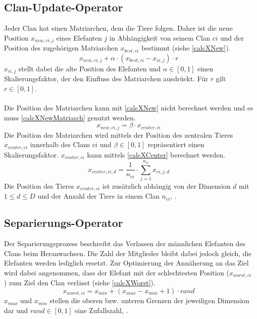 \subsection{Clan-Update-Operator} \label{eho_clanUpdate}
Jeder Clan hat einen Matriarchen, dem die Tiere folgen. Daher ist die neue Position $x_{new, ci, j}$ eines Elefanten $j$ in Abhängigkeit von seinem Clan $ci$ und der Position des zugehörigen Matriarchen $x_{best, ci}$ bestimmt (siehe \autoref{calcXNew}). 
\begin{equation}
    x_{new, ci, j} + \alpha \cdot (x_{best, ci} - x_{ci, j}) \cdot r
    \label{calcXNew}
\end{equation}
$x_{ci, j}$ stellt dabei die alte Position des Elefanten und $\alpha \in [0,1]$ einen Skalierungsfaktor, der den Einfluss des Matriarchen ausdrückt. Für $r$ gilt $r \in [0,1]$.\\
\\
Die Position des Matriarchen kann mit \autoref{calcXNew} nicht berechnet werden und es muss \autoref{calcXNewMatriarch} genutzt werden.
\begin{equation}
    x_{new, ci, j} = \beta \cdot x_{center, ci}
    \label{calcXNewMatriarch}
\end{equation}
Die Position des Matriarchen wird mittels der Position des zentralen Tieres $x_{center, ci}$ innerhalb des Clans $ci$ und $\beta \in [0,1]$ repräsentiert einen Skalierungsfaktor. $x_{center, ci}$ kann mittels \autoref{calcXCenter} berechnet werden.
\begin{equation}
    x_{center, ci, d} = \frac{1}{n_{ci}} \cdot \sum_{j=1}^{n_{ci}} x_{ci,j,d}
    \label{calcXCenter}
\end{equation}
Die Position des Tieres $x_{center, ci}$ ist zusätzlich abhängig von der Dimension $d$ mit $1 \leq d \leq D$ und der Anzahl der Tiere in einem Clan $n_{ci}$, \cite[vgl. Wang et al, S.2]{wang_deb_coelho_2015}.

\subsection{Separierungs-Operator} \label{eho_separate}
Der Separierungsprozess beschreibt das Verlassen der männlichen Elefanten des Clans beim Heranwachsen. Die Zahl der Mitglieder bleibt dabei jedoch gleich, die Elefanten werden lediglich ersetzt. Zur Optimierung der Annäherung an das Ziel wird dabei angenommen, dass der Elefant mit der schlechtesten Position ($x_{worst, ci}$) zum Ziel den Clan verlässt (siehe \autoref{calcXWorst}).
\begin{equation}
    x_{worst, ci} = x_{min} + (x_{max} - x_{min} + 1) \cdot rand
    \label{calcXWorst}
\end{equation}
$x_{max}$ und $x_{min}$ stellen die oberen bzw. unteren Grenzen der jeweiligen Dimension dar und $rand \in [0,1]$ eine Zufallszahl, \cite[vgl. Wang et al, S.2]{wang_deb_coelho_2015}.

